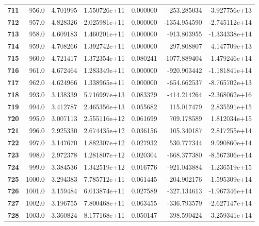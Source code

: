 \documentclass{report}[12pt]
\begin{document}
\begin{center}
\begin{tabular}{lrrrrrr}
\textbf{711 } &          956.0 &   4.701995 &  1.550726e+11 &    0.000000 &  -253.285034 & -3.927756e+13 \\
\textbf{712 } &          957.0 &   4.828326 &  2.025981e+11 &    0.000000 & -1354.954590 & -2.745112e+14 \\
\textbf{713 } &          958.0 &   4.609183 &  1.460201e+11 &    0.000000 &  -913.803955 & -1.334338e+14 \\
\textbf{714 } &          959.0 &   4.708266 &  1.392742e+11 &    0.000000 &   297.808807 &  4.147709e+13 \\
\textbf{715 } &          960.0 &   4.721417 &  1.372354e+11 &    0.080241 & -1077.889404 & -1.479246e+14 \\
\textbf{716 } &          961.0 &   4.672464 &  1.283349e+11 &    0.000000 &  -920.903442 & -1.181841e+14 \\
\textbf{717 } &          962.0 &   4.624966 &  1.338965e+11 &    0.000000 &  -654.662537 & -8.765702e+13 \\
\textbf{718 } &          993.0 &   3.138339 &  5.716997e+13 &    0.083329 &  -414.214264 & -2.368062e+16 \\
\textbf{719 } &          994.0 &   3.412787 &  2.465356e+13 &    0.055682 &   115.017479 &  2.835591e+15 \\
\textbf{720 } &          995.0 &   3.007113 &  2.555116e+12 &    0.061699 &   709.178589 &  1.812034e+15 \\
\textbf{721 } &          996.0 &   2.925330 &  2.674435e+12 &    0.036156 &   105.340187 &  2.817255e+14 \\
\textbf{722 } &          997.0 &   3.147670 &  1.882307e+12 &    0.027932 &   530.777344 &  9.990860e+14 \\
\textbf{723 } &          998.0 &   2.972378 &  1.281807e+12 &    0.020304 &  -668.377380 & -8.567306e+14 \\
\textbf{724 } &          999.0 &   3.384536 &  1.342519e+12 &    0.016776 &  -921.043884 & -1.236519e+15 \\
\textbf{725 } &         1000.0 &   3.294383 &  7.785712e+11 &    0.061445 &  -204.902176 & -1.595309e+14 \\
\textbf{726 } &         1001.0 &   3.159484 &  6.013874e+11 &    0.027589 &  -327.134613 & -1.967346e+14 \\
\textbf{727 } &         1002.0 &   3.196755 &  7.800468e+11 &    0.063455 &  -336.793579 & -2.627147e+14 \\
\textbf{728 } &         1003.0 &   3.360824 &  8.177168e+11 &    0.050147 &  -398.590424 & -3.259341e+14 \\

\end{tabular}
\end{center}
\end{document}
